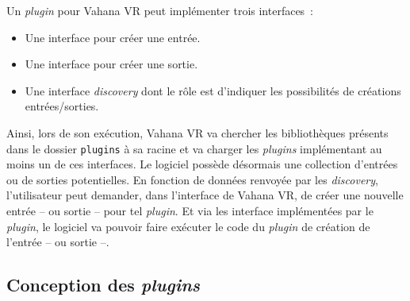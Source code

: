 Un \textit{plugin} pour Vahana VR peut implémenter trois interfaces~:
\begin{itemize}
  \item Une interface pour créer une entrée.
  \item Une interface pour créer une sortie.
  \item Une interface \textit{discovery} dont le rôle est d'indiquer les possibilités
    de créations entrées/sorties.
\end{itemize}
Ainsi, lors de son exécution, Vahana VR va chercher les bibliothèques présents dans le dossier
\texttt{plugins} à sa racine et va charger les \textit{plugins} implémentant
au moins un de ces interfaces. Le logiciel possède désormais une collection d'entrées
ou de sorties potentielles. En fonction de données renvoyée par les \textit{discovery},
l'utilisateur peut demander, dans l'interface de Vahana VR, de 
créer une nouvelle entrée -- ou sortie -- pour tel \textit{plugin}. Et via les
interface implémentées par le \textit{plugin}, le logiciel va pouvoir faire exécuter le code
du \textit{plugin} de création de l'entrée -- ou sortie --.\\

\subsection{Conception des \textit{plugins}}

